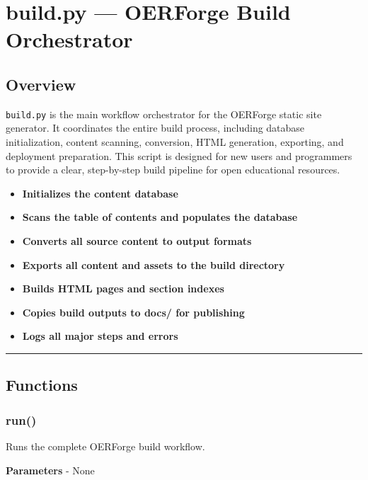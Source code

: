 \section{build.py --- OERForge Build
Orchestrator}\label{build.py-oerforge-build-orchestrator}

\subsection{Overview}\label{overview}

\texttt{build.py} is the main workflow orchestrator for the OERForge
static site generator. It coordinates the entire build process,
including database initialization, content scanning, conversion, HTML
generation, exporting, and deployment preparation. This script is
designed for new users and programmers to provide a clear, step-by-step
build pipeline for open educational resources.

\begin{itemize}
\tightlist
\item
  \textbf{Initializes the content database}
\item
  \textbf{Scans the table of contents and populates the database}
\item
  \textbf{Converts all source content to output formats}
\item
  \textbf{Exports all content and assets to the build directory}
\item
  \textbf{Builds HTML pages and section indexes}
\item
  \textbf{Copies build outputs to docs/ for publishing}
\item
  \textbf{Logs all major steps and errors}
\end{itemize}

\begin{center}\rule{0.5\linewidth}{0.5pt}\end{center}

\subsection{Functions}\label{functions}

\subsubsection{run()}\label{run}

Runs the complete OERForge build workflow.

\textbf{Parameters} - None

